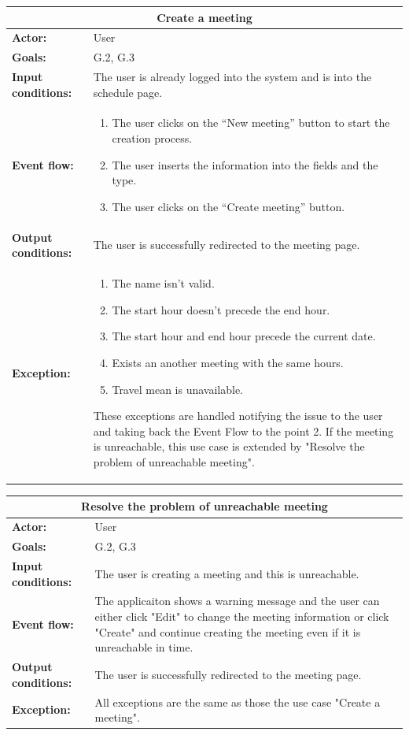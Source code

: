 \begin{tabular} { p{5cm} p{8cm} }  
\multicolumn{2}{c}{\textbf{Create a meeting}}\\
\hline
\textbf{Actor:} & User \\ 
\textbf{Goals:} & G.2, G.3 \\ 
\textbf{Input conditions:} & The user is already logged into the system and is into the schedule page. \\
\textbf{Event flow:} & \begin{enumerate}
				\item
				The user clicks on the “New meeting” button to start the creation process.
				\item
				The user inserts the information  into the fields and the type.
				\item
				The user clicks on the “Create meeting” button.
			\end{enumerate}\\ 
\textbf{Output conditions:} & The user is successfully redirected to the
meeting page.\\ 
\textbf{Exception:} & \begin{enumerate}
				\item
				The name isn’t valid.
				\item
				The start hour doesn’t precede the end hour.
				\item
				The start hour and end hour precede the current date.
				\item
				Exists an another meeting with the same hours. 
				\item
				Travel mean is unavailable. 
			\end{enumerate}
These exceptions are handled notifying the issue to the user and taking back the Event Flow to the point 2.
If the meeting is unreachable, this use case is extended by "Resolve the problem of unreachable meeting".
\\
\hline
\end{tabular}

\begin{tabular} { p{5cm} p{8cm} }  
\multicolumn{2}{c}{\textbf{Resolve the problem of unreachable meeting}}\\
\hline
\textbf{Actor:} & User \\ 
\textbf{Goals:} & G.2, G.3 \\ 
\textbf{Input conditions:} & The user is creating a meeting and this is unreachable.\\
\textbf{Event flow:} & The applicaiton shows a warning message and the user can either click "Edit" to change the meeting information or click "Create" and continue creating the meeting even if it is unreachable in time.\\ 
\textbf{Output conditions:} & The user is successfully redirected to the
meeting page.\\ 
\textbf{Exception:} & All exceptions are the same as those the use case "Create a meeting". \\
\hline
\end{tabular}

